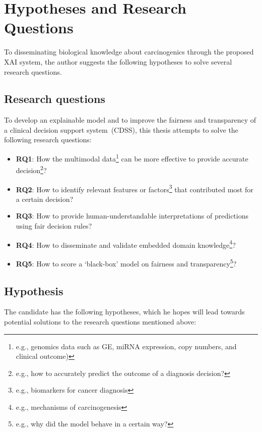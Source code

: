 \section{Hypotheses and Research Questions} \label{hypotheses}
To disseminating biological knowledge about carcinogenics through the proposed XAI system, the author suggests the following hypotheses to solve several research questions.  

\subsection{Research questions}
To develop an explainable model and to improve the fairness and transparency of a clinical decision support system~(CDSS), this thesis attempts to solve the following research questions: 

\vspace{-2mm}
\begin{itemize}[noitemsep]
    \item \textbf{RQ1}: How the multimodal data\footnote{e.g., genomics data such as GE, miRNA expression, copy numbers, and clinical outcome)} can be more effective to provide accurate decision\footnote{e.g., how to accurately predict the outcome of a diagnosis decision?}? 
    \item \textbf{RQ2}: How to identify relevant features or factors\footnote{e.g., biomarkers for cancer diagnosis} that contributed most for a certain decision? 
    \item \textbf{RQ3}: How to provide human-understandable interpretations of predictions using fair decision rules? 
    \item \textbf{RQ4}: How to disseminate and validate embedded domain knowledge\footnote{e.g., mechanisms of carcinogenesis}?
    \item \textbf{RQ5}: How to score a `black-box' model on fairness and transparency\footnote{e.g., why did the model behave in a certain way?}? 
\end{itemize}
\vspace{-2mm}

\subsection{Hypothesis}
The candidate has the following hypotheses, which he hopes will lead towards potential solutions to the research questions mentioned above:

